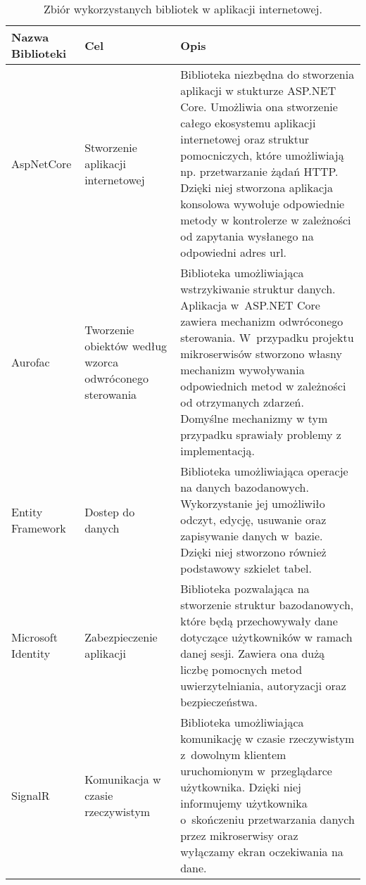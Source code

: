 \begin{center}
    \begin{longtable}{ | p{3.1cm} | p{4cm} | p{6.5cm} |}
   	\caption{Zbiór wykorzystanych bibliotek w aplikacji internetowej.}
   	\label{librariesDotNet} \\
    \hline Nazwa \newline Biblioteki & Cel & Opis \\ \hline    
    
    \hline AspNetCore &
   			 Stworzenie aplikacji internetowej
   		
    & Biblioteka niezbędna do stworzenia aplikacji w stukturze ASP.NET Core. Umożliwia ona stworzenie całego ekosystemu aplikacji internetowej oraz struktur pomocniczych, które umożliwiają np. przetwarzanie żądań HTTP. Dzięki niej stworzona aplikacja konsolowa wywołuje odpowiednie metody w kontrolerze w zależności od zapytania wysłanego na odpowiedni adres url.\\ \hline
    
    \hline 
    Aurofac 
    & Tworzenie obiektów według wzorca odwróconego sterowania
    & Biblioteka umożliwiająca wstrzykiwanie struktur danych. Aplikacja w~ASP.NET Core zawiera mechanizm odwróconego sterowania. W~przypadku projektu mikroserwisów stworzono własny mechanizm wywoływania odpowiednich metod w zależności od otrzymanych zdarzeń. Domyślne mechanizmy w tym przypadku sprawiały problemy z implementacją.\\ \hline
    
    \hline Entity \newline Framework
    & Dostep do danych
    &  Biblioteka umożliwiająca operacje na danych bazodanowych. Wykorzystanie jej umożliwiło odczyt, edycję, usuwanie oraz zapisywanie danych w~bazie. Dzięki niej stworzono również podstawowy szkielet tabel.
    \\ \hline
    
    \hline Microsoft \newline Identity 
    & Zabezpieczenie \newline aplikacji
   	& Biblioteka pozwalająca na stworzenie struktur bazodanowych, które będą przechowywały dane dotyczące użytkowników w ramach danej sesji. Zawiera ona dużą liczbę pomocnych metod uwierzytelniania, autoryzacji oraz bezpieczeństwa. \\ \hline
    
    \hline SignalR 
    & Komunikacja w czasie rzeczywistym
    & Biblioteka umożliwiająca komunikację w czasie rzeczywistym z~dowolnym klientem uruchomionym w~przeglądarce użytkownika. Dzięki niej informujemy użytkownika o~skończeniu przetwarzania danych przez mikroserwisy oraz wyłączamy ekran oczekiwania na dane.\\ \hline
    

\end{longtable}
\end{center}
